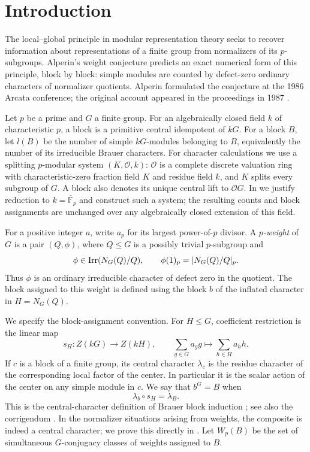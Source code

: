 \section{Introduction}\label{sec:introduction}

The local--global principle in modular representation theory seeks to recover
information about representations of a finite group from normalizers of its
$p$-subgroups. Alperin's weight conjecture predicts an exact numerical form
of this principle, block by block: simple modules are counted by defect-zero
ordinary characters of normalizer quotients. Alperin formulated the
conjecture at the 1986 Arcata conference; the original account appeared in
the proceedings in 1987 \cite{Alperin1987,FLZ2023}.

Let $p$ be a prime and $G$ a finite group. For an algebraically closed field
$k$ of characteristic $p$, a block is a primitive central idempotent of
$kG$. For a block $B$, let $l(B)$ be the number of simple $kG$-modules
belonging to $B$, equivalently the number of its irreducible Brauer
characters. For character calculations we use a splitting $p$-modular
system $(K,\mathcal O,k)$: $\mathcal O$ is a complete discrete valuation
ring with characteristic-zero fraction field $K$ and residue field $k$,
and $K$ splits every subgroup of $G$. A block also denotes its unique
central lift to $\mathcal O G$. In  we justify
reduction to $k=\overline{\mathbb F}_p$ and construct such a system;
the resulting counts and block assignments are unchanged over any
algebraically closed extension of this field.

For a positive integer $a$, write $a_p$ for its largest power-of-$p$ divisor. A \emph{$p$-weight} of $G$ is a pair $(Q,\phi)$, where $Q\leq G$ is a possibly trivial $p$-subgroup and
\[
 \phi\in\operatorname{Irr}(N_G(Q)/Q),\qquad
 \phi(1)_p=|N_G(Q)/Q|_p.
\]
Thus $\phi$ is an ordinary irreducible character of defect zero in the quotient. The block assigned to this weight is defined using the block $b$ of the inflated character in $H=N_G(Q)$.

We specify the block-assignment convention. For $H\leq G$, coefficient restriction is the linear map
\[
 s_H:Z(kG)\longrightarrow Z(kH),\qquad
 \sum_{g\in G}a_g g\longmapsto\sum_{h\in H}a_hh.
\]
If $c$ is a block of a finite group, its central character $\lambda_c$ is the residue character of the corresponding local factor of the center. In particular it is the scalar action of the center on any simple module in $c$. We say that $b^G=B$ when
\begin{equation}\label{eq:block-assignment}
 \lambda_b\circ s_H=\lambda_B.
\end{equation}
This is the central-character definition of Brauer block induction \cite[p.~338]{Carlson1971}; see also the corrigendum \cite{Carlson1973}. In the normalizer situations arising from weights, the composite is indeed a central character; we prove this directly in . Let $W_p(B)$ be the set of simultaneous $G$-conjugacy classes of weights assigned to $B$.

